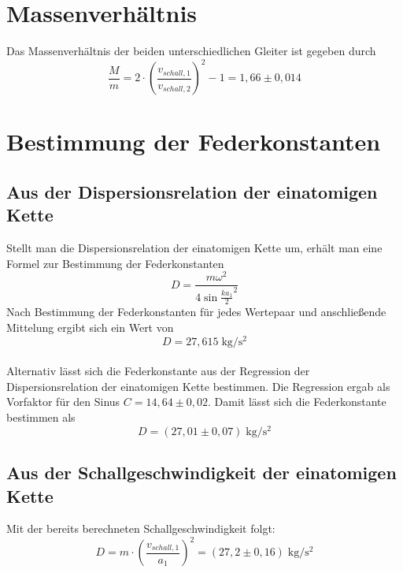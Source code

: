 \section{Massenverhältnis}

Das Massenverhältnis der beiden unterschiedlichen Gleiter ist gegeben durch
\begin{equation}
	\frac{M}{m} = 2\cdot\left(\frac{v_{schall,1}}{v_{schall,2}}\right)^2 - 1 = 1,66 \pm 0,014
\end{equation}

\section{Bestimmung der Federkonstanten}
\subsection{Aus der Dispersionsrelation der einatomigen Kette}

Stellt man die Dispersionsrelation der einatomigen Kette um, erhält man eine Formel zur Bestimmung der Federkonstanten
\begin{equation}
	D = \frac{m\omega^2}{4\sin{\frac{ka_1}{2}^2}}
\end{equation}
Nach Bestimmung der Federkonstanten für jedes Wertepaar und anschließende Mittelung ergibt sich ein Wert von
\begin{equation}
	D = 27,615\;\si{\kilogram\per\square\second}
\end{equation}\\
Alternativ lässt sich die Federkonstante aus der Regression der Dispersionsrelation der einatomigen Kette bestimmen.
Die Regression ergab als Vorfaktor für den Sinus $C = 14,64 \pm 0,02$. Damit lässt sich die Federkonstante bestimmen als
\begin{equation}
	D = (27,01 \pm 0,07)\;\si{\kilogram\per\square\second}
\end{equation}

\subsection{Aus der Schallgeschwindigkeit der einatomigen Kette}

Mit der bereits berechneten Schallgeschwindigkeit folgt:
\begin{equation}
	D = m\cdot\left(\frac{v_{schall,1}}{a_1}\right)^2 = (27,2 \pm 0,16)\;\si{\kilogram\per\square\second}
\end{equation}

